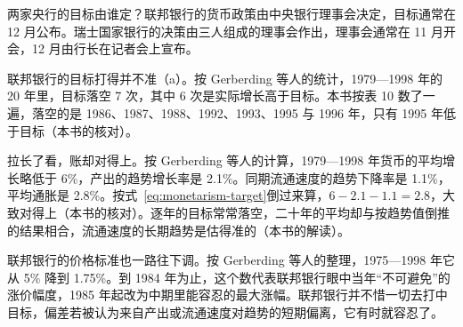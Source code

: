 
两家央行的目标由谁定？联邦银行的货币政策由中央银行理事会决定，目标通常在 12 月公布\cite{gerberding2004}。瑞士国家银行的决策由三人组成的理事会作出，理事会通常在 11 月开会，12 月由行长在记者会上宣布\cite{rich2003}。

联邦银行的目标打得并不准（a）。按 Gerberding 等人的统计，1979—1998 年的 20 年里，目标落空 7 次，其中 6 次是实际增长高于目标\cite{gerberding2004}。本书按表 10 数了一遍，落空的是 1986、1987、1988、1992、1993、1995 与 1996 年，只有 1995 年低于目标（本书的核对）。

拉长了看，账却对得上。按 Gerberding 等人的计算，1979—1998 年货币的平均增长略低于 6\%，产出的趋势增长率是 2.1\%\cite{gerberding2004}。同期流通速度的趋势下降率是 1.1\%，平均通胀是 2.8\%\cite{gerberding2004}。按式~\eqref{eq:monetarism-target}倒过来算，$6-2.1-1.1=2.8$，大致对得上（本书的核对）。逐年的目标常常落空，二十年的平均却与按趋势值倒推的结果相合，流通速度的长期趋势是估得准的（本书的解读）。

联邦银行的价格标准也一路往下调。按 Gerberding 等人的整理，1975—1998 年它从 5\% 降到 1.75\%\cite{gerberding2004}。到 1984 年为止，这个数代表联邦银行眼中当年“不可避免”的涨价幅度，1985 年起改为中期里能容忍的最大涨幅\cite{gerberding2004}。联邦银行并不惜一切去打中目标，偏差若被认为来自产出或流通速度对趋势的短期偏离，它有时就容忍了\cite{gerberding2004}。

